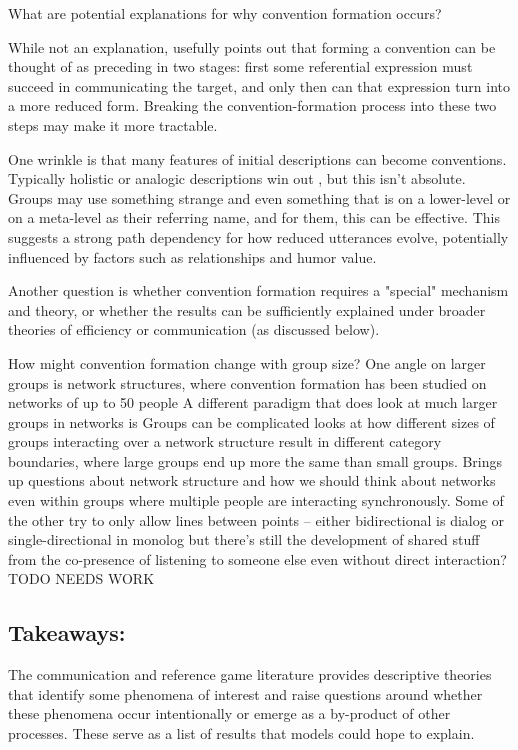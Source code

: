 \documentclass[]{article}
\begin{document}
What are potential explanations for why convention formation occurs?

While not an explanation, \cite{leung2023} usefully points out that forming a convention can be thought of as preceding in two stages: first some referential expression must succeed in communicating the target, and only then can that expression turn into a more reduced form. Breaking the convention-formation process into these two steps may make it more tractable. 


One wrinkle is that many features of initial descriptions can become conventions. Typically holistic or analogic descriptions win out \cite{clark1986}, but this isn't absolute. Groups may use something strange and even something that is on a lower-level or on a meta-level as their referring name, and for them, this can be effective. This suggests a strong path dependency for how reduced utterances evolve, potentially influenced by factors such as relationships and humor value. 

Another question is whether convention formation requires a "special" mechanism and theory, or whether the results can be sufficiently explained under broader theories of efficiency or communication (as discussed below). 

How might convention formation change with group size? 
One angle on larger groups is network structures, where convention formation has been studied on networks of up to 50 people \citep{guilbeault2021}
A different paradigm that does look at much larger groups in networks is 	Groups can be complicated \cite{guilbeault2021} looks at how different sizes of groups interacting over a network structure result in different category boundaries, where large groups end up more the same than small groups. Brings up questions about network structure and how we should think about networks even within groups where multiple people are interacting synchronously. Some of the other try to only allow lines between points -- either bidirectional is dialog or single-directional in monolog but there's still the development of shared stuff from the co-presence of listening to someone else even without direct interaction? TODO NEEDS WORK


\subsection{Takeaways:} The communication and reference game literature provides descriptive theories that identify some phenomena of interest and raise questions around whether these phenomena occur intentionally or emerge as a by-product of other processes. These serve as a list of results that models could hope to explain. 
\end{document}
